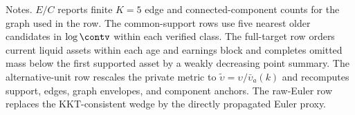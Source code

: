 \begin{table}[H]
\centering
\caption{Nearby $\PVEU$-margin target pair II: omitted support, units, and wedge layers}
\label{tab:nearby-policy-layers}
\footnotesize
\renewcommand{\arraystretch}{1.08}
\begin{minipage}{0.98\textwidth}
\footnotesize Notes. $E/C$ reports finite $K=5$ edge and connected-component counts for the graph used in the row. The common-support rows use five nearest older candidates in $\log\contv$ within each verified class. The full-target row orders current liquid assets within each age and earnings block and completes omitted mass below the first supported asset by a weakly decreasing point summary. The alternative-unit row rescales the private metric to $\widetilde\upsilon=\upsilon/\bar\upsilon_a(k)$ and recomputes support, edges, graph envelopes, and component anchors. The raw-Euler row replaces the KKT-consistent wedge by the directly propagated Euler proxy.
\end{minipage}
\end{table}
